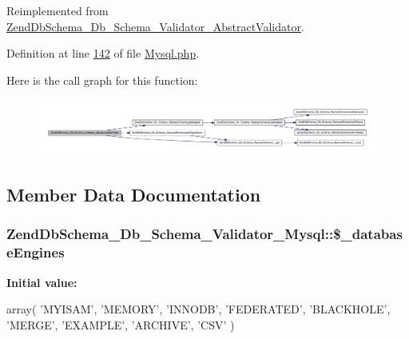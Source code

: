 \-Reimplemented from \hyperlink{classZendDbSchema__Db__Schema__Validator__AbstractValidator_a097f3953952902e3a2d48e200427ed8b}{\-Zend\-Db\-Schema\-\_\-\-Db\-\_\-\-Schema\-\_\-\-Validator\-\_\-\-Abstract\-Validator}.



\-Definition at line \hyperlink{Schema_2Validator_2Mysql_8php_source_l00142}{142} of file \hyperlink{Schema_2Validator_2Mysql_8php_source}{\-Mysql.\-php}.



\-Here is the call graph for this function\-:\nopagebreak
\begin{figure}[H]
\begin{center}
\leavevmode
\includegraphics[width=350pt]{classZendDbSchema__Db__Schema__Validator__Mysql_a0c68fa05f88c3a6f603b04709133ef68_cgraph}
\end{center}
\end{figure}




\subsection{\-Member \-Data \-Documentation}
\hypertarget{classZendDbSchema__Db__Schema__Validator__Mysql_a8f8a21aecd14b6a055d6828b2c097ab9}{
\subsubsection[{\$\-\_\-database\-Engines}]{\setlength{\rightskip}{0pt plus 5cm}\-Zend\-Db\-Schema\-\_\-\-Db\-\_\-\-Schema\-\_\-\-Validator\-\_\-\-Mysql\-::\$\-\_\-database\-Engines}}\label{classZendDbSchema__Db__Schema__Validator__Mysql_a8f8a21aecd14b6a055d6828b2c097ab9}
{\bfseries \-Initial value\-:}
\begin{DoxyCode}
 array(
        \textcolor{stringliteral}{'MYISAM'},
        \textcolor{stringliteral}{'MEMORY'},
        \textcolor{stringliteral}{'INNODB'},
        \textcolor{stringliteral}{'FEDERATED'},
        \textcolor{stringliteral}{'BLACKHOLE'},
        \textcolor{stringliteral}{'MERGE'},
        \textcolor{stringliteral}{'EXAMPLE'},
        \textcolor{stringliteral}{'ARCHIVE'},
        \textcolor{stringliteral}{'CSV'}
    )
\end{DoxyCode}


